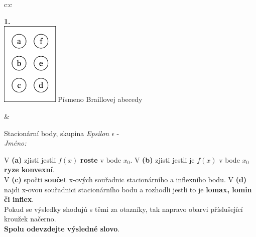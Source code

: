 \documentclass[10pt]{report}
\begin{document}
\begin{tabular}{c:c}
\begin{minipage}[c][104.5mm][t]{0.5\linewidth}
\begin{center}
\begin{minipage}{0.79\linewidth}
\end{minipage}
\begin{minipage}{0.20\linewidth}
\begin{center}
{\Huge\bfseries 1.} \\[2mm]
\includegraphics[height=40mm]{../images/braille.png}
{\small Písmeno Braillovej abecedy}
\end{center}
\end{minipage}
\end{center}
\end{minipage}
&
\begin{minipage}[c][104.5mm][t]{0.5\linewidth}
\begin{center}
\vspace{7mm}
{\huge Stacionární body, skupina \textit{Epsilon $\epsilon$} -}\\[5mm]
\textit{Jméno:}\phantom{xxxxxxxxxxxxxxxxxxxxxxxxxxxxxxxxxxxxxxxxxxxxxxxxxxxxxxxxxxxxxxxxx}\\[5mm]
\begin{minipage}{0.95\linewidth}
\begin{center}
{\small V \textbf{(a)} zjisti jestli $f(x)$ \textbf{roste} v bode $x_0$. V \textbf{(b)} zjisti jestli je $f(x)$ v bode $x_0$ \textbf{ryze konvexní}.\\V \textbf{(c)} spočti \textbf{součet} x-ových souřadnic stacionárního a inflexního bodu. V \textbf{(d)} najdi x-ovou souřadnici stacionárního bodu a rozhodli jestli to je \textbf{lomax, lomin či inflex}.\\Pokud se výsledky shodujú s těmi za otazníky, tak napravo obarvi příslušející kroužek načerno.\\\textbf{Spolu odevzdejte výsledné slovo}}.
\end{center}
\end{minipage}
\\[1mm]
\begin{minipage}{0.79\linewidth}
\begin{center}
\begin{varwidth}{\linewidth}
\begin{enumerate}
\normalsize

\end{enumerate}
\end{varwidth}
\end{center}
\end{minipage}
\end{center}
\end{minipage}
\end{tabular}
\end{document}
